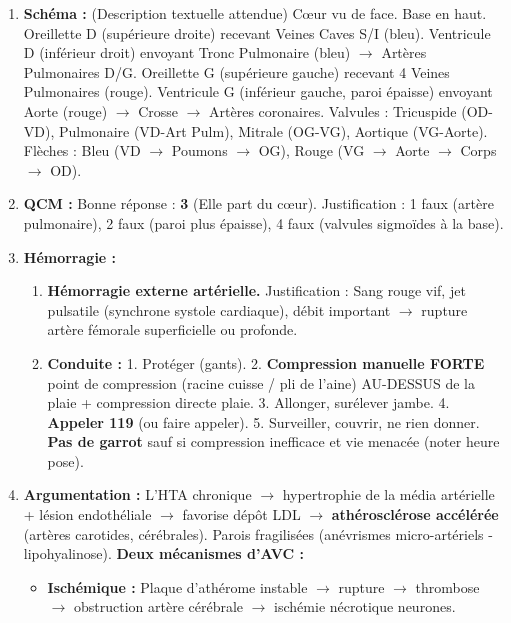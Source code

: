 \documentclass[11pt]{article}
\begin{document}
\begin{corrige}
\begin{enumerate}
\item \textbf{Schéma :} (Description textuelle attendue) Cœur vu de face. Base en haut. Oreillette D (supérieure droite) recevant Veines Caves S/I (bleu). Ventricule D (inférieur droit) envoyant Tronc Pulmonaire (bleu) $\rightarrow$ Artères Pulmonaires D/G. Oreillette G (supérieure gauche) recevant 4 Veines Pulmonaires (rouge). Ventricule G (inférieur gauche, paroi épaisse) envoyant Aorte (rouge) $\rightarrow$ Crosse $\rightarrow$ Artères coronaires. Valvules : Tricuspide (OD-VD), Pulmonaire (VD-Art Pulm), Mitrale (OG-VG), Aortique (VG-Aorte). Flèches : Bleu (VD $\rightarrow$ Poumons $\rightarrow$ OG), Rouge (VG $\rightarrow$ Aorte $\rightarrow$ Corps $\rightarrow$ OD).
\item \textbf{QCM :} Bonne réponse : \textbf{3} (Elle part du cœur). Justification : 1 faux (artère pulmonaire), 2 faux (paroi plus épaisse), 4 faux (valvules sigmoïdes à la base).
\item \textbf{Hémorragie :}
    \begin{enumerate}
    \item \textbf{Hémorragie externe artérielle.} Justification : Sang rouge vif, jet pulsatile (synchrone systole cardiaque), débit important $\rightarrow$ rupture artère fémorale superficielle ou profonde.
    \item \textbf{Conduite :} 1. Protéger (gants). 2. \textbf{Compression manuelle FORTE} point de compression (racine cuisse / pli de l'aine) AU-DESSUS de la plaie + compression directe plaie. 3. Allonger, surélever jambe. 4. \textbf{Appeler 119} (ou faire appeler). 5. Surveiller, couvrir, ne rien donner. \textbf{Pas de garrot} sauf si compression inefficace et vie menacée (noter heure pose).
    \end{enumerate}
\item \textbf{Argumentation :} L'HTA chronique $\rightarrow$ hypertrophie de la média artérielle + lésion endothéliale $\rightarrow$ favorise dépôt LDL $\rightarrow$ \textbf{athérosclérose accélérée} (artères carotides, cérébrales). Parois fragilisées (anévrismes micro-artériels - lipohyalinose). \textbf{Deux mécanismes d'AVC :}
    \begin{itemize}
    \item \textbf{Ischémique :} Plaque d'athérome instable $\rightarrow$ rupture $\rightarrow$ thrombose $\rightarrow$ obstruction artère cérébrale $\rightarrow$ ischémie nécrotique neurones.

\end{itemize}
\end{enumerate}
\end{corrige}
\end{document}
